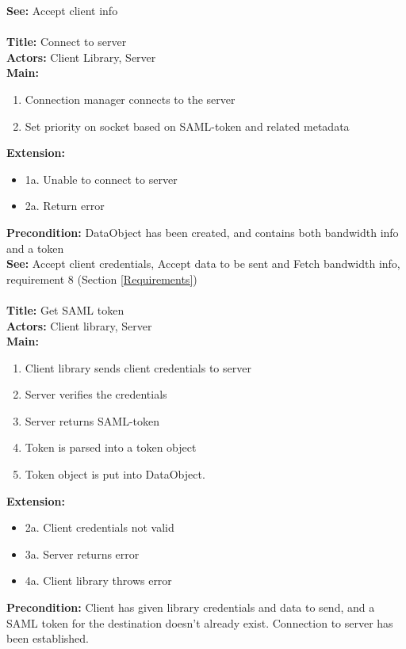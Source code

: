 		\textbf{See:} Accept client info
		\\\\
		\textbf{Title:} Connect to server \\
		\textbf{Actors:} Client Library, Server \\
		\textbf{Main:}
		\begin{enumerate}	
			\item Connection manager connects to the server
			\item Set priority on socket based on SAML-token and related metadata
		\end{enumerate}
		\textbf{Extension:}
		\begin{itemize}
			  \item[] 1a. Unable to connect to server
			  \item[] 2a. Return error
		\end{itemize}
		\textbf{Precondition:} DataObject has been created, and contains both bandwidth info and a token \\
		\textbf{See:} Accept client credentials, Accept data to be sent and Fetch bandwidth info, requirement 8 (Section \ref{Requirements})
		\\\\
		\textbf{Title:} Get SAML token \\
		\textbf{Actors:} Client library, Server \\
		\textbf{Main:}
		\begin{enumerate}
			\item Client library sends client credentials to server
			\item Server verifies the credentials
			\item Server returns SAML-token
			\item Token is parsed into a token object
			\item Token object is put into DataObject.
		\end{enumerate}
		\textbf{Extension:}
		\begin{itemize}
	        \item[] 2a. Client credentials not valid
			\item[] 3a. Server returns error
			\item[] 4a. Client library throws error
		\end{itemize}
		\textbf{Precondition:} Client has given library credentials and data to send, and a SAML token for the destination doesn’t already exist. Connection to server has been established. \\
